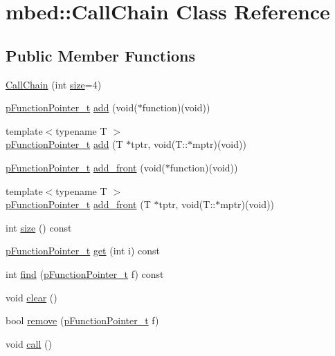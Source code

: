 \hypertarget{classmbed_1_1_call_chain}{}\section{mbed\+:\+:Call\+Chain Class Reference}
\label{classmbed_1_1_call_chain}
\subsection*{Public Member Functions}
\begin{DoxyCompactItemize}
\item 
\hyperlink{classmbed_1_1_call_chain_a01b2b14e23b60c4d81522b19ef04cd9b}{Call\+Chain} (int \hyperlink{classmbed_1_1_call_chain_ac2231dfa186291dbe64f7756be5f78fb}{size}=4)
\item 
\hyperlink{classmbed_1_1_function_pointer_arg1}{p\+Function\+Pointer\+\_\+t} \hyperlink{classmbed_1_1_call_chain_a232d59392bfaff0d3950a240f2fee952}{add} (void($\ast$function)(void))
\item 
{\footnotesize template$<$typename T $>$ }\\\hyperlink{classmbed_1_1_function_pointer_arg1}{p\+Function\+Pointer\+\_\+t} \hyperlink{classmbed_1_1_call_chain_a9bd78a3e92768bfafb562d0257297247}{add} (T $\ast$tptr, void(T\+::$\ast$mptr)(void))
\item 
\hyperlink{classmbed_1_1_function_pointer_arg1}{p\+Function\+Pointer\+\_\+t} \hyperlink{classmbed_1_1_call_chain_a050f0042e62f8271a507ca57d19e6846}{add\+\_\+front} (void($\ast$function)(void))
\item 
{\footnotesize template$<$typename T $>$ }\\\hyperlink{classmbed_1_1_function_pointer_arg1}{p\+Function\+Pointer\+\_\+t} \hyperlink{classmbed_1_1_call_chain_ae7f7fe79166ad44e24131a4609a61a14}{add\+\_\+front} (T $\ast$tptr, void(T\+::$\ast$mptr)(void))
\item 
int \hyperlink{classmbed_1_1_call_chain_ac2231dfa186291dbe64f7756be5f78fb}{size} () const 
\item 
\hyperlink{classmbed_1_1_function_pointer_arg1}{p\+Function\+Pointer\+\_\+t} \hyperlink{classmbed_1_1_call_chain_aed5a10fb63c039c7163472bff18a18a0}{get} (int i) const 
\item 
int \hyperlink{classmbed_1_1_call_chain_a124e1ee11cac95565e2b3e69453ac9e1}{find} (\hyperlink{classmbed_1_1_function_pointer_arg1}{p\+Function\+Pointer\+\_\+t} f) const 
\item 
void \hyperlink{classmbed_1_1_call_chain_a65693758d2e75e3390e64d27b98556c2}{clear} ()
\item 
bool \hyperlink{classmbed_1_1_call_chain_a4396b8d6374b95f13c95775bd8e0137a}{remove} (\hyperlink{classmbed_1_1_function_pointer_arg1}{p\+Function\+Pointer\+\_\+t} f)
\item 
void \hyperlink{classmbed_1_1_call_chain_ac911bd44ea0a14da0b0dd46187bf1081}{call} ()
\end{DoxyCompactItemize}



